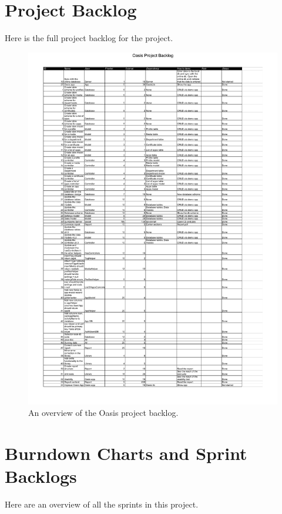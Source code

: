 

\section{Project Backlog}
\label{sec:projectBacklog}
Here is the full project backlog for the project.

\begin{figure}[H]
	\centering
		\includegraphics[width=\textwidth]{Images/OasisProjectBacklog}
	\caption{An overview of the Oasis project backlog.}
	\label{fig:projectBacklog}
\end{figure}

\section{Burndown Charts and Sprint Backlogs}
\label{sec:burn_back}
Here are an overview of all the sprints in this project.
	
